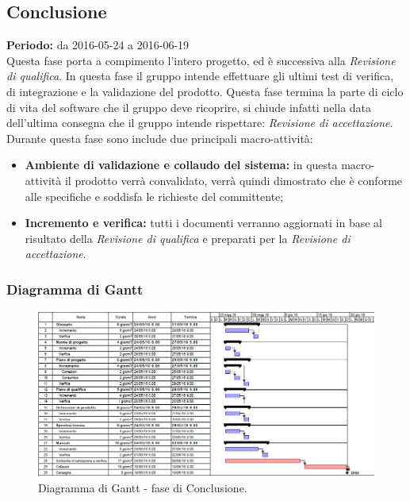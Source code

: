 \documentclass[a4paper]{article}
\begin{document}
		\subsection{Conclusione}
			\textbf{Periodo:} da 2016-05-24 a 2016-06-19 \\
			
			Questa fase porta a compimento l'intero progetto, ed è successiva alla \emph{Revisione di qualifica}. In questa fase
			il gruppo intende effettuare gli ultimi test di verifica, di integrazione e la validazione del prodotto. 
			Questa fase termina la parte di ciclo di vita del software che il gruppo deve ricoprire, si chiude infatti nella data 
			dell'ultima consegna che il gruppo intende rispettare: \emph{Revisione di accettazione}.
			Durante questa fase sono include due principali macro-attività:
			\begin{itemize}
				\item \textbf{Ambiente di validazione e collaudo del sistema:} in questa macro-attività il prodotto verrà 
				convalidato, verrà quindi dimostrato che è conforme alle specifiche e soddisfa le richieste del committente;
				\item \textbf{Incremento e verifica:} tutti i documenti verranno aggiornati in base al risultato della 
				\emph{Revisione di qualifica} e preparati per la \emph{Revisione di accettazione}.
			\end{itemize}
			\subsubsection{Diagramma di Gantt}
				\begin{figure}[H]
					\centering
					\includegraphics[width=\textwidth]{gantt_conclusione}
					\caption{Diagramma di Gantt - fase di Conclusione.}
				\end{figure}
\end{document}
